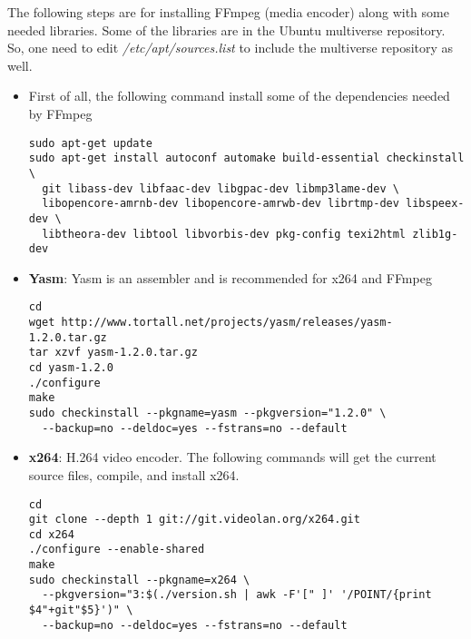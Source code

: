 The following steps are for installing FFmpeg (media encoder) along with some needed libraries. Some of the libraries are in the Ubuntu multiverse repository. So, one need to edit \textit{/etc/apt/sources.list} to include the multiverse repository as well.

\begin{itemize}
\item First of all, the following command install some of the dependencies needed by FFmpeg

\begin{code}
\begin{verbatim}
sudo apt-get update
sudo apt-get install autoconf automake build-essential checkinstall \
  git libass-dev libfaac-dev libgpac-dev libmp3lame-dev \
  libopencore-amrnb-dev libopencore-amrwb-dev librtmp-dev libspeex-dev \
  libtheora-dev libtool libvorbis-dev pkg-config texi2html zlib1g-dev
\end{verbatim}
\end{code}

\item{\textbf{Yasm}:} Yasm is an assembler and is recommended for x264 and FFmpeg

\begin{code}
\begin{verbatim}
cd
wget http://www.tortall.net/projects/yasm/releases/yasm-1.2.0.tar.gz
tar xzvf yasm-1.2.0.tar.gz
cd yasm-1.2.0
./configure
make
sudo checkinstall --pkgname=yasm --pkgversion="1.2.0" \
  --backup=no --deldoc=yes --fstrans=no --default
\end{verbatim}
\end{code}

\item{\textbf{x264}:} H.264 video encoder. The following commands will get the current source files, compile, and install x264.
 
\begin{code}
\begin{verbatim}
cd
git clone --depth 1 git://git.videolan.org/x264.git
cd x264
./configure --enable-shared
make
sudo checkinstall --pkgname=x264 \
  --pkgversion="3:$(./version.sh | awk -F'[" ]' '/POINT/{print $4"+git"$5}')" \
  --backup=no --deldoc=yes --fstrans=no --default 
\end{verbatim}
\end{code}


\end{itemize}
